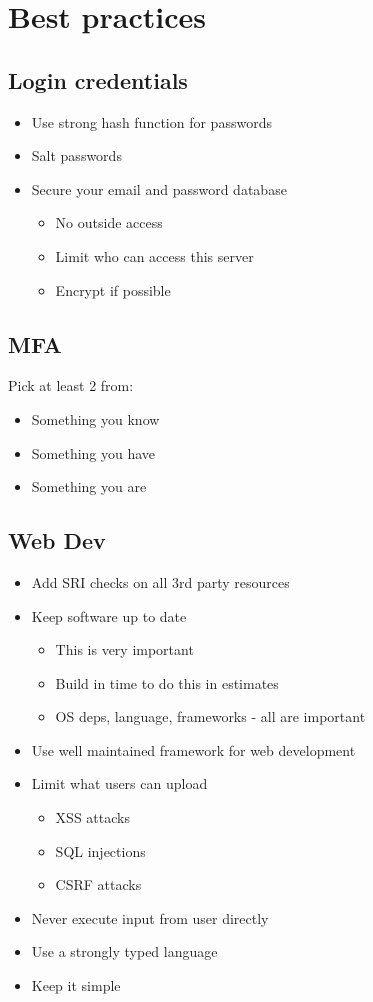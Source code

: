 \documentclass{article}[18pt]
\begin{document}
\section{Best practices}
\subsection{Login credentials}
\begin{itemize}
	\item Use strong hash function for passwords
	\item Salt passwords
	\item Secure your email and password database
	\begin{itemize}
		\item No outside access
		\item Limit who can access this server
		\item Encrypt if possible
	\end{itemize}
\end{itemize}
\subsection{MFA}
Pick at least 2 from:
\begin{itemize}
	\item Something you know
	\item Something you have
	\item Something you are
\end{itemize}
\subsection{Web Dev}
\begin{itemize}
	\item Add SRI checks on all 3rd party resources
	\item Keep software up to date
	\begin{itemize}
		\item This is very important
		\item Build in time to do this in estimates
		\item OS deps, language, frameworks - all are important
	\end{itemize}
	\item Use well maintained framework for web development
	\item Limit what users can upload
	\begin{itemize}
		\item XSS attacks
		\item SQL injections
		\item CSRF attacks
	\end{itemize}
	\item Never execute input from user directly
	\item Use a strongly typed language
	\item Keep it simple
\end{itemize}
\end{document}
